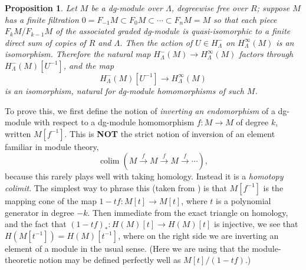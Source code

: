 \documentclass{memo-l}
\newtheorem{proposition}[theorem]{Proposition}
\theoremstyle{definition}
\theoremstyle{remark}
\numberwithin{section}{chapter}
\numberwithin{equation}{chapter}
\begin{document}
\begin{proposition}\label{TateLoc}Let $M$ be a dg-module over $\Lambda$, degreewise free over $R$; suppose $M$ has a finite filtration $0 = F_{-1}M \subset F_0 M \subset \cdots \subset F_n M = M$ so that each piece $F_k M/F_{k-1}M$ of the associated graded dg-module is quasi-isomorphic to a finite direct sum of copies of $R$ and $\Lambda$. Then the action of $U \in H^-_\Lambda$ on $H^\infty_\Lambda(M)$ is an isomorphism. Therefore the natural map $H^-_\Lambda(M) \to H^\infty_\Lambda(M)$ factors through $H^-_\Lambda(M)[U^{-1}]$, and the map $$H^-_\Lambda(M)[U^{-1}] \to H^\infty_\Lambda(M)$$ is an isomorphism, natural for dg-module homomorphisms of such $M$.
\end{proposition}

To prove this, we first define the notion of \emph{inverting an endomorphism} of a dg-module with respect to a dg-module homomorphism $f: M \to M$ of degree $k$, written $M[f^{-1}]$. This is \textbf{NOT} the strict notion of inversion of an element familiar in module theory, $$\operatorname{colim} \left(M \xrightarrow{f} M \xrightarrow{f} M \xrightarrow{f} \cdots\right),$$ because this rarely plays well with taking homology. Instead it is a \emph{homotopy colimit}. The simplest way to phrase this (taken from \cite[Definition~24.5]{HRanicki}) is that $M[f^{-1}]$ is the mapping cone of the map $1-tf: M[t] \to M[t]$, where $t$ is a polynomial generator in degree $-k$. Then immediate from the exact triangle on homology, and the fact that $(1-tf)_*: H(M)[t] \to H(M)[t]$ is injective, we see that $H(M[t^{-1}]) = H(M)[t^{-1}]$, where on the right side we are inverting an element of a module in the usual sense. (Here we are using that the module-theoretic notion may be defined perfectly well as $M[t]/(1-tf)$.) 
\end{document}
